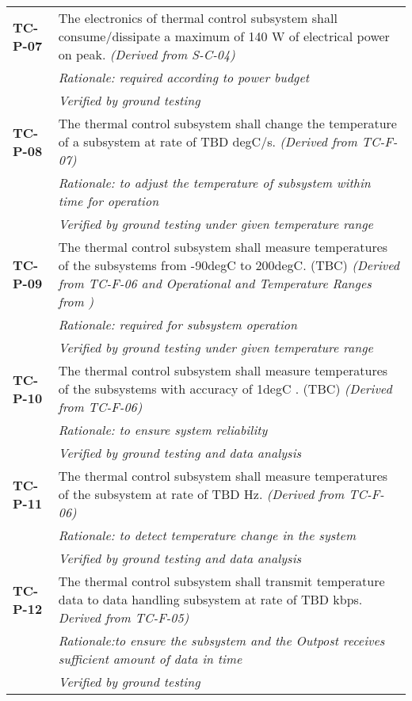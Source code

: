 \begin{longtable}{P{2cm}P{13.25cm}}
\textbf{TC-P-07}	& The electronics of thermal control subsystem shall consume/dissipate a maximum of 140 \gls{W} of electrical power on peak.
\textit{(Derived from S-C-04)} \\
& \textit{Rationale: required according to power budget} \\
&  \textit{Verified by ground testing}	\\

\textbf{TC-P-08}	& The thermal control subsystem shall change the temperature of a subsystem at rate of \gls{TBD} \gls{degC/s}. \textit{(Derived from TC-F-07)} \\
 & \textit{Rationale: to adjust the temperature of subsystem within time for operation} \\
 & \textit{Verified by ground testing under given temperature range}\\

\textbf{TC-P-09}	& The thermal control subsystem shall measure temperatures of the subsystems from -90\gls{degC} to 200\gls{degC}. (\gls{TBC}) \textit{(Derived from TC-F-06 and Operational and Temperature Ranges from )} \\
 & \textit{Rationale: required for subsystem operation} \\
 &  \textit{Verified by ground testing under given temperature range}	\\

\textbf{TC-P-10}	& The thermal control subsystem shall measure temperatures of the subsystems with accuracy of 1\gls{degC} \cite{temp_sensors}. (\gls{TBC}) \textit{(Derived from TC-F-06)} \\
 & \textit{Rationale: to ensure system reliability} \\
  &  \textit{Verified by ground testing and data analysis}	\\

\textbf{TC-P-11}	& The thermal control subsystem shall measure temperatures of the subsystem at rate of \gls{TBD} \gls{Hz}. \textit{(Derived from TC-F-06)} \\ 
 & \textit{Rationale: to detect temperature change in the system} \\
 &  \textit{Verified by ground testing and data analysis}	\\
 
\textbf{TC-P-12}	& The thermal control subsystem shall transmit temperature data to data handling subsystem at rate of \gls{TBD} \gls{kbps}. \textit{Derived from TC-F-05)} \\
 & \textit{Rationale:to ensure the subsystem and the Outpost receives sufficient amount of data in time} \\
 &  \textit{Verified by ground testing}			\\


\end{longtable}
